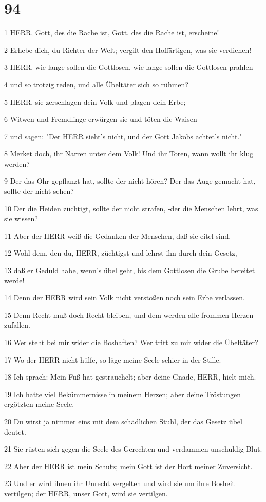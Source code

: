 \chapter{94}

\par 1 HERR, Gott, des die Rache ist, Gott, des die Rache ist, erscheine!
\par 2 Erhebe dich, du Richter der Welt; vergilt den Hoffärtigen, was sie verdienen!
\par 3 HERR, wie lange sollen die Gottlosen, wie lange sollen die Gottlosen prahlen
\par 4 und so trotzig reden, und alle Übeltäter sich so rühmen?
\par 5 HERR, sie zerschlagen dein Volk und plagen dein Erbe;
\par 6 Witwen und Fremdlinge erwürgen sie und töten die Waisen
\par 7 und sagen: "Der HERR sieht's nicht, und der Gott Jakobs achtet's nicht."
\par 8 Merket doch, ihr Narren unter dem Volk! Und ihr Toren, wann wollt ihr klug werden?
\par 9 Der das Ohr gepflanzt hat, sollte der nicht hören? Der das Auge gemacht hat, sollte der nicht sehen?
\par 10 Der die Heiden züchtigt, sollte der nicht strafen, -der die Menschen lehrt, was sie wissen?
\par 11 Aber der HERR weiß die Gedanken der Menschen, daß sie eitel sind.
\par 12 Wohl dem, den du, HERR, züchtigst und lehrst ihn durch dein Gesetz,
\par 13 daß er Geduld habe, wenn's übel geht, bis dem Gottlosen die Grube bereitet werde!
\par 14 Denn der HERR wird sein Volk nicht verstoßen noch sein Erbe verlassen.
\par 15 Denn Recht muß doch Recht bleiben, und dem werden alle frommen Herzen zufallen.
\par 16 Wer steht bei mir wider die Boshaften? Wer tritt zu mir wider die Übeltäter?
\par 17 Wo der HERR nicht hülfe, so läge meine Seele schier in der Stille.
\par 18 Ich sprach: Mein Fuß hat gestrauchelt; aber deine Gnade, HERR, hielt mich.
\par 19 Ich hatte viel Bekümmernisse in meinem Herzen; aber deine Tröstungen ergötzten meine Seele.
\par 20 Du wirst ja nimmer eins mit dem schädlichen Stuhl, der das Gesetz übel deutet.
\par 21 Sie rüsten sich gegen die Seele des Gerechten und verdammen unschuldig Blut.
\par 22 Aber der HERR ist mein Schutz; mein Gott ist der Hort meiner Zuversicht.
\par 23 Und er wird ihnen ihr Unrecht vergelten und wird sie um ihre Bosheit vertilgen; der HERR, unser Gott, wird sie vertilgen.

